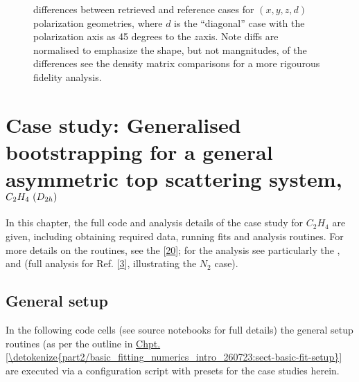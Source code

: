\documentclass[letterpaper,table,10pt,english]{jupyterBook}
\begin{document}
\begin{figure}[htbp]
\centering
\capstart

\noindent{}
\caption{{\hyperref[\detokenize{backmatter/glossary:term-MF}]{}} differences between retrieved and reference cases for \((x,y,z,d)\) polarization geometries, where \(d\) is the “diagonal” case with the polarization axis as 45 degrees to the \(z\)\sphinxhyphen{}axis. Note diffs are normalised to emphasize the shape, but not mangnitudes, of the differences \sphinxhyphen{} see the density matrix comparisons for a more rigourous fidelity analysis.}\label{\detokenize{part2/case-study-OCS_290723:fig-ocs-diff}}\end{figure}

\sphinxstepscope


\chapter{Case study: Generalised bootstrapping for a general asymmetric top scattering system, \protect\(C_2H_4~(D_{2h})\protect\)}
\label{\detokenize{part2/case-study-C2H4_290723:case-study-generalised-bootstrapping-for-a-general-asymmetric-top-scattering-system-c-2h-4-d-2h}}\label{\detokenize{part2/case-study-C2H4_290723:chpt-c2h4-case-study}}\label{\detokenize{part2/case-study-C2H4_290723::doc}}
\sphinxAtStartPar
In this chapter, the full code and analysis details of the case study for \(C_2H_4\) are given, including obtaining required data, running fits and analysis routines. For more details on the routines, see the  {[}\hyperlink{cite.backmatter/bibliography:id680}{20}{]}; for the analysis see particularly the , and  (full analysis for Ref. {[}\hyperlink{cite.backmatter/bibliography:id685}{3}{]}, illustrating the \(N_2\) case).


\section{General setup}
\label{\detokenize{part2/case-study-C2H4_290723:general-setup}}
\sphinxAtStartPar
In the following code cells (see source notebooks for full details) the general setup routines (as per the outline in \hyperref[\detokenize{part2/basic_fitting_numerics_intro_260723:sect-basic-fit-setup}]{Chpt.\@ \ref{\detokenize{part2/basic_fitting_numerics_intro_260723:sect-basic-fit-setup}}} are executed via a configuration script with presets for the case studies herein.
\end{document}
